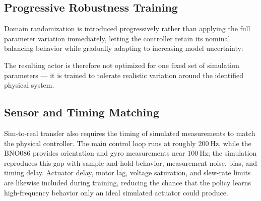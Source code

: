 \documentclass[9pt]{extarticle}
\begin{document}
\FloatBarrier

\subsection{Progressive Robustness Training}

Domain randomization is introduced progressively rather than applying the
full parameter variation immediately, letting the controller retain its
nominal balancing behavior while gradually adapting to increasing model
uncertainty:

\begin{center}
\end{center}

The resulting actor is therefore not optimized for one fixed set of
simulation parameters — it is trained to tolerate realistic variation
around the identified physical system.

\subsection{Sensor and Timing Matching}

Sim-to-real transfer also requires the timing of simulated measurements to
match the physical controller. The main control loop runs at roughly
$200~\mathrm{Hz}$, while the BNO086 provides orientation and gyro
measurements near $100~\mathrm{Hz}$; the simulation reproduces this gap
with sample-and-hold behavior, measurement noise, bias, and timing delay.
Actuator delay, motor lag, voltage saturation, and slew-rate limits are
likewise included during training, reducing the chance that the policy
learns high-frequency behavior only an ideal simulated actuator could
produce.
\end{document}
